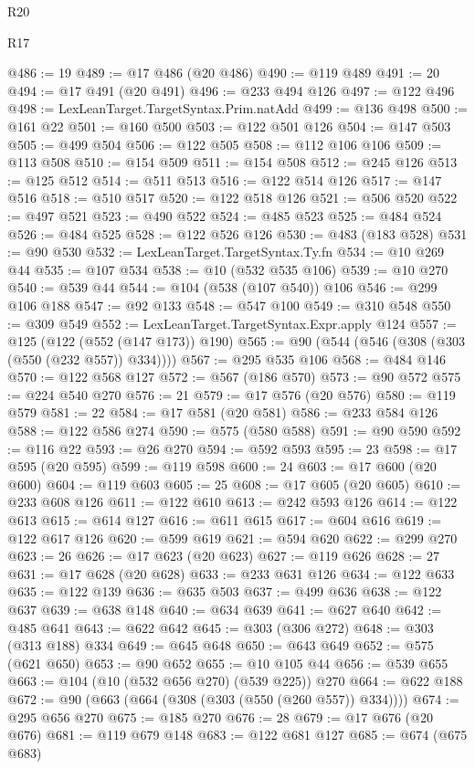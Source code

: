 \begin{lexlean}{R20}
\begin{lexlean}{R17}
\begin{coremodule}
{{{{{{{{{{{{{{{{{{{{{{{{{{{{{{{{{{{{{{{{{{{{{{{{{{{{{{{{{{{{{{{{{{{{{{{{{{{{{{{{{{{{{{{{{{{{{{{{{{{{{{{{{{{@486 := 19
@489 := @17 @486 (@20 @486)
@490 := @119 @489
@491 := 20
@494 := @17 @491 (@20 @491)
@496 := @233 @494 @126
@497 := @122 @496
@498 := LexLeanTarget.TargetSyntax.Prim.natAdd
@499 := @136 @498
@500 := @161 @22
@501 := @160 @500
@503 := @122 @501 @126
@504 := @147 @503
@505 := @499 @504
@506 := @122 @505
@508 := @112 @106 @106
@509 := @113 @508
@510 := @154 @509
@511 := @154 @508
@512 := @245 @126
@513 := @125 @512
@514 := @511 @513
@516 := @122 @514 @126
@517 := @147 @516
@518 := @510 @517
@520 := @122 @518 @126
@521 := @506 @520
@522 := @497 @521
@523 := @490 @522
@524 := @485 @523
@525 := @484 @524
@526 := @484 @525
@528 := @122 @526 @126
@530 := @483 (@183 @528)
@531 := @90 @530
@532 := LexLeanTarget.TargetSyntax.Ty.fn
@534 := @10 @269 @44
@535 := @107 @534
@538 := @10 (@532 @535 @106)
@539 := @10 @270
@540 := @539 @44
@544 := @104 (@538 (@107 @540)) @106
@546 := @299 @106 @188
@547 := @92 @133
@548 := @547 @100
@549 := @310 @548
@550 := @309 @549
@552 := LexLeanTarget.TargetSyntax.Expr.apply @124
@557 := @125 (@122 (@552 (@147 @173)) @190)
@565 := @90 (@544 (@546 (@308 (@303 (@550 (@232 @557)) @334))))
@567 := @295 @535 @106
@568 := @484 @146
@570 := @122 @568 @127
@572 := @567 (@186 @570)
@573 := @90 @572
@575 := @224 @540 @270
@576 := 21
@579 := @17 @576 (@20 @576)
@580 := @119 @579
@581 := 22
@584 := @17 @581 (@20 @581)
@586 := @233 @584 @126
@588 := @122 @586 @274
@590 := @575 (@580 @588)
@591 := @90 @590
@592 := @116 @22
@593 := @26 @270
@594 := @592 @593
@595 := 23
@598 := @17 @595 (@20 @595)
@599 := @119 @598
@600 := 24
@603 := @17 @600 (@20 @600)
@604 := @119 @603
@605 := 25
@608 := @17 @605 (@20 @605)
@610 := @233 @608 @126
@611 := @122 @610
@613 := @242 @593 @126
@614 := @122 @613
@615 := @614 @127
@616 := @611 @615
@617 := @604 @616
@619 := @122 @617 @126
@620 := @599 @619
@621 := @594 @620
@622 := @299 @270
@623 := 26
@626 := @17 @623 (@20 @623)
@627 := @119 @626
@628 := 27
@631 := @17 @628 (@20 @628)
@633 := @233 @631 @126
@634 := @122 @633
@635 := @122 @139
@636 := @635 @503
@637 := @499 @636
@638 := @122 @637
@639 := @638 @148
@640 := @634 @639
@641 := @627 @640
@642 := @485 @641
@643 := @622 @642
@645 := @303 (@306 @272)
@648 := @303 (@313 @188) @334
@649 := @645 @648
@650 := @643 @649
@652 := @575 (@621 @650)
@653 := @90 @652
@655 := @10 @105 @44
@656 := @539 @655
@663 := @104 (@10 (@532 @656 @270) (@539 @225)) @270
@664 := @622 @188
@672 := @90 (@663 (@664 (@308 (@303 (@550 (@260 @557)) @334))))
@674 := @295 @656 @270
@675 := @185 @270
@676 := 28
@679 := @17 @676 (@20 @676)
@681 := @119 @679 @148
@683 := @122 @681 @127
@685 := @674 (@675 @683)
}}}}}}}}}}}}}}}}}}}}}}}}}}}}}}}}}}}}}}}}}}}}}}}}}}}}}}}}}}}}}}}}}}}}}}}}}}}}}}}}}}}}}}}}}}}}}}}}}}}}}}}}}}}
\end{coremodule}
\end{lexlean}
\end{lexlean}
